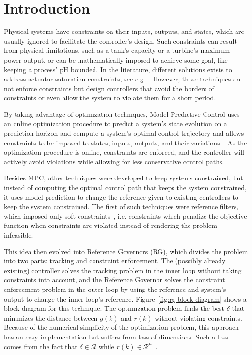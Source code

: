
\chapter{Introduction}%
\label{chp:introduction}

Physical systems have constraints on their inputs, outputs, and states, which
are usually ignored to facilitate the controller's design. Such constraints can
result from physical limitations, such as a tank's capacity or a turbine's
maximum power output, or can be mathematically imposed to achieve some goal,
like keeping a process' pH bounded. In the literature, different solutions
exists to address actuator saturation constraints, see
e.g.~\parencite{klug.castelan.ea:fuzzy,tarbouriech.garcia.ea:stability}.
However, those techniques do not enforce constraints but design controllers that
avoid the borders of constraints or even allow the system to violate them for a
short period.

By taking advantage of optimization techniques, Model Predictive Control uses an
online optimization procedure to predict a system's state evolution on a
prediction horizon and compute a system's optimal control trajectory and allows
constraints to be imposed to states, inputs, outputs, and their
variations~\parencite{wang:model,zhang:fast}. As the optimization procedure is
online, constraints are enforced, and the controller will actively avoid
violations while allowing for less conservative control paths.

Besides MPC, other techniques were developed to keep systems constrained, but
instead of computing the optimal control path that keeps the system constrained,
it uses model prediction to change the reference given to existing controllers
to keep the system constrained. The first of such techniques were reference
filters, which imposed only
soft-constraints~\parencite{vahidi.kolmanovsky.ea:constraint}, i.e. constraints
which penalize the objective function when constraints are violated instead of
rendering the problem infeasible.

This idea then evolved into Reference Governors (RG), which divides the problem
into two parts: tracking and constraint enforcement. The (possibly already
existing) controller solves the tracking problem in the inner loop without
taking constraints into account, and the Reference Governor solves the
constraint enforcement problem in the outer loop by using the reference and
system's output to change the inner loop's reference.
Figure~\ref{fig:rg-block-diagram} shows a block diagram for this technique. The
optimization problem finds the best \(\delta\) that minimizes the distance between
\(g(k)\) and \(r(k)\) without violating constraints. Because of the numerical
simplicity of the optimization problem, this approach has an easy implementation
but suffers from loss of dimensions. Such a loss comes from the fact that
\(\delta\in\mathcal{R}\) while
\(r(k)\in\mathcal{R}^n\)~\parencite{gilbert.kolmanovsky:fast}.

